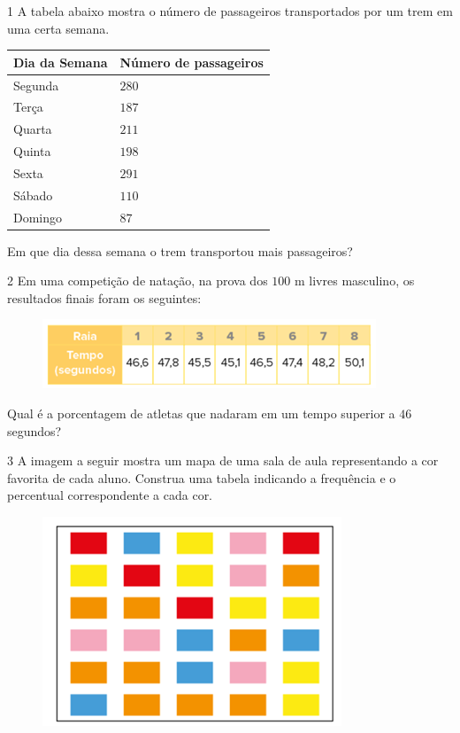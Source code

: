 
\num{1}  A tabela abaixo mostra o número de passageiros transportados por um
trem em uma certa semana.

\begin{longtable}[]{@{}ll@{}}
\toprule
Dia da Semana & Número de passageiros\tabularnewline
\midrule
\endhead
Segunda & $280$\tabularnewline
Terça & $187$\tabularnewline
Quarta & $211$\tabularnewline
Quinta & $198$\tabularnewline
Sexta & $291$\tabularnewline
Sábado & $110$\tabularnewline
Domingo & $87$\tabularnewline
\bottomrule
\end{longtable}

Em que dia dessa semana o trem transportou mais passageiros?


\num{2}  Em uma competição de natação, na prova dos $100$ m livres masculino, os
resultados finais foram os seguintes:

\begin{figure}
\includegraphics[width=3.92708in,height=0.8125in]{./imgSAEB_6_MAT/media/image81.png}
\end{figure}

Qual é a porcentagem de atletas que nadaram em um tempo superior a $46$
segundos?


\num{3}  A imagem a seguir mostra um mapa de uma sala de aula representando a
cor favorita de cada aluno. Construa uma tabela indicando a frequência e
o percentual correspondente a cada cor.

\begin{figure}
\includegraphics[width=3.52292in,height=2.45347in]{./imgSAEB_6_MAT/media/image82.png}
\end{figure}

